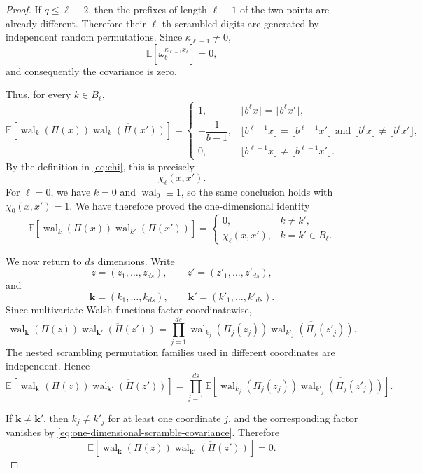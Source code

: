 \documentclass[11pt]{article}
\newcommand{\wal}{\operatorname{wal}}
\begin{document}
\begin{proof}
If \(q\leq\ell-2\), then the prefixes of length \(\ell-1\) of the two
points are already different.  Therefore their \(\ell\)-th scrambled
digits are generated by independent random permutations.  Since
\(\kappa_{\ell-1}\neq0\),
\[
 \mathbb E\!\left[
   \omega_b^{\kappa_{\ell-1}\widetilde x_\ell}
 \right]
 =
 0,
\]
and consequently the covariance is zero.

Thus, for every \(k\in B_\ell\),
\[
 \mathbb E\!\left[
   \wal_k(\Pi(x))
   \overline{\wal_k(\Pi(x'))}
 \right]
 =
 \begin{cases}
  1,
  &
  \lfloor b^\ell x\rfloor
  =
  \lfloor b^\ell x'\rfloor,
  \\[1mm]
  -\dfrac{1}{b-1},
  &
  \lfloor b^{\ell-1}x\rfloor
  =
  \lfloor b^{\ell-1}x'\rfloor
  \text{ and }
  \lfloor b^\ell x\rfloor
  \neq
  \lfloor b^\ell x'\rfloor,
  \\[3mm]
  0,
  &
  \lfloor b^{\ell-1}x\rfloor
  \neq
  \lfloor b^{\ell-1}x'\rfloor.
 \end{cases}
\]
By the definition in \eqref{eq:chi}, this is precisely
\[
 \chi_\ell(x,x').
\]
For \(\ell=0\), we have \(k=0\) and
\(\wal_0\equiv1\), so the same conclusion holds with
\(\chi_0(x,x')=1\).  We have therefore proved the one-dimensional
identity
\begin{equation}\label{eq:one-dimensional-scramble-covariance}
 \mathbb E\!\left[
   \wal_k(\Pi(x))
   \overline{\wal_{k'}(\Pi(x'))}
 \right]
 =
 \begin{cases}
  0, & k\neq k',\\
  \chi_\ell(x,x'), & k=k'\in B_\ell.
 \end{cases}
\end{equation}

We now return to \(ds\) dimensions.  Write
\[
 z=(z_1,\ldots,z_{ds}),
 \qquad
 z'=(z'_1,\ldots,z'_{ds}),
\]
and
\[
 \boldsymbol k=(k_1,\ldots,k_{ds}),
 \qquad
 \boldsymbol k'=(k'_1,\ldots,k'_{ds}).
\]
Since multivariate Walsh functions factor coordinatewise,
\[
 \wal_{\boldsymbol k}(\Pi(z))
 \overline{\wal_{\boldsymbol k'}(\Pi(z'))}
 =
 \prod_{j=1}^{ds}
 \wal_{k_j}(\Pi_j(z_j))
 \overline{\wal_{k'_j}(\Pi_j(z'_j))}.
\]
The nested scrambling permutation families used in different
coordinates are independent.  Hence
\[
 \mathbb E\!\left[
 \wal_{\boldsymbol k}(\Pi(z))
 \overline{\wal_{\boldsymbol k'}(\Pi(z'))}
 \right]
 =
 \prod_{j=1}^{ds}
 \mathbb E\!\left[
 \wal_{k_j}(\Pi_j(z_j))
 \overline{\wal_{k'_j}(\Pi_j(z'_j))}
 \right].
\]

If \(\boldsymbol k\neq\boldsymbol k'\), then
\(k_j\neq k'_j\) for at least one coordinate \(j\), and the
corresponding factor vanishes by
\eqref{eq:one-dimensional-scramble-covariance}.  Therefore
\[
 \mathbb E\!\left[
 \wal_{\boldsymbol k}(\Pi(z))
 \overline{\wal_{\boldsymbol k'}(\Pi(z'))}
 \right]
 =0.
\]


\end{proof}
\end{document}
